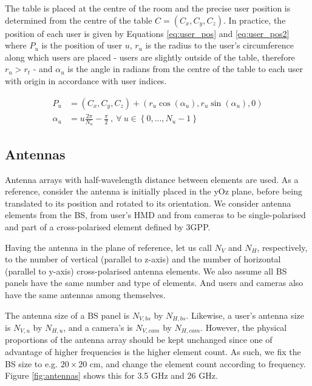 
\vspace{.6cm}

The table is placed at the centre of the room and the precise user position is determined from the centre of the table $C = (C_x, C_y, C_z)$. In practice, the position of each user is given by Equations \eqref{eq:user_pos} and \eqref{eq:user_pos2} where $P_u$ is the position of user $u$, $r_u$ is the radius to the user's circumference along which users are placed - users are slightly outside of the table, therefore $r_u > r_t$ - and $\alpha_u$ is the angle in radians from the centre of the table to each user with origin in accordance with user indices. 

\begin{align} 
    P_u &= (C_x, C_y, C_z) + (r_u \cos(\alpha_u), r_u \sin(\alpha_u), 0) \label{eq:user_pos} \\
    \alpha_u &= u  \frac{2 \pi}{N_u} - \frac{\pi}{2} \ , \ \forall \ u \in \left\{0, ..., N_u - 1\right\} \label{eq:user_pos2}
\end{align}

\subsection{Antennas}
\label{sec:modelling_antennas}
Antenna arrays with half-wavelength distance between elements are used. As a reference, consider the antenna is initially placed in the yOz plane, before being translated to its position and rotated to its orientation. We consider antenna elements from the \ac{BS}, from user's \ac{HMD} and from cameras to be single-polarised and part of a cross-polarised element defined by 3GPP. 

Having the antenna in the plane of reference, let us call $N_V$ and $N_H$, respectively, to the number of vertical (parallel to z-axis) and the number of horizontal (parallel to y-axis) cross-polarised antenna elements. We also assume all BS panels have the same number and type of elements. And users and cameras also have the same antennas among themselves. 

The antenna size of a \ac{BS} panel is $N_{V,bs}$ by $N_{H,bs}$. Likewise, a user's antenna size is $N_{V,u}$ by $N_{H,u}$, and a camera's is $N_{V,cam}$ by $N_{H,cam}$. However, the physical proportions of the antenna array should be kept unchanged since one of advantage of higher frequencies is the higher element count. As such, we fix the BS size to e.g. $20 \times 20$ cm, and change the element count according to frequency. Figure \ref{fig:antennas} shows this for 3.5 GHz and 26 GHz.


